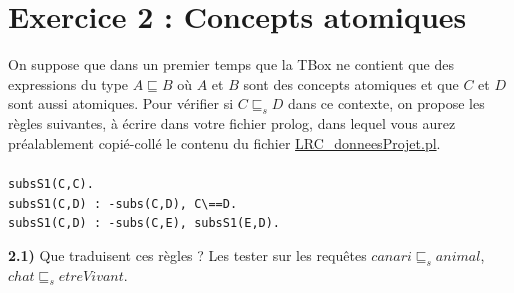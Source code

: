 \documentclass[a4paper,12pt]{report}
\begin{document}

\section*{Exercice 2 : Concepts atomiques}

On suppose que dans un premier temps que la TBox ne contient que des expressions du type \(A \sqsubseteq B\) où \(A\) et \(B\) sont des concepts
    atomiques et que \(C\) et \(D\) sont aussi atomiques. Pour vérifier si \(C \sqsubseteq_s D\) dans ce contexte, on propose les règles suivantes,
    à écrire dans votre fichier prolog, dans lequel vous aurez préalablement copié-collé le contenu du fichier \href{./LRC\_donneesProjet.pl}{LRC\_donneesProjet.pl}.\\\\
\texttt{subsS1(C,C).}\\
\texttt{subsS1(C,D) : -subs(C,D), C\textbackslash==D.}\\
\texttt{subsS1(C,D) : -subs(C,E), subsS1(E,D).}\\




\vspace{0.5cm}

{}

\textbf{2.1)} Que traduisent ces règles ? Les tester sur les requêtes \(canari \sqsubseteq_s animal\), \(chat \sqsubseteq_s etreVivant\).
\end{document}
